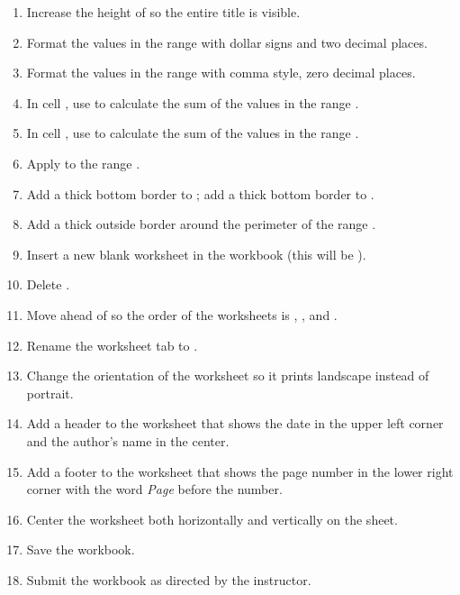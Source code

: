 \begin{enumerate}
	\item Increase the height of  so the entire title is visible.
	\item Format the values in the range  with dollar signs and two decimal places.
	\item Format the values in the range  with comma style, zero decimal places.
	\item In cell , use  to calculate the sum of the values in the range .
	\item In cell , use  to calculate the sum of the values in the range .
	\item Apply  to the range .
	\item Add a thick bottom border to ; add a thick bottom border to .
	\item Add a thick outside border around the perimeter of the range .
	\item Insert a new blank worksheet in the workbook (this will be ).
	\item Delete .
	\item Move  ahead of  so the order of the worksheets is , , and .
	\item Rename the  worksheet tab to .
	\item Change the orientation of the  worksheet so it prints landscape instead of portrait.
	\item Add a header to the  worksheet that shows the date in the upper left corner and the author's name in the center.
	\item Add a footer to the  worksheet that shows the page number in the lower right corner with the word \textit{Page} before the number.
	\item Center the worksheet both horizontally and vertically on the sheet.
	\item Save the  workbook.
	\item Submit the  workbook as directed by the instructor.

\end{enumerate}
